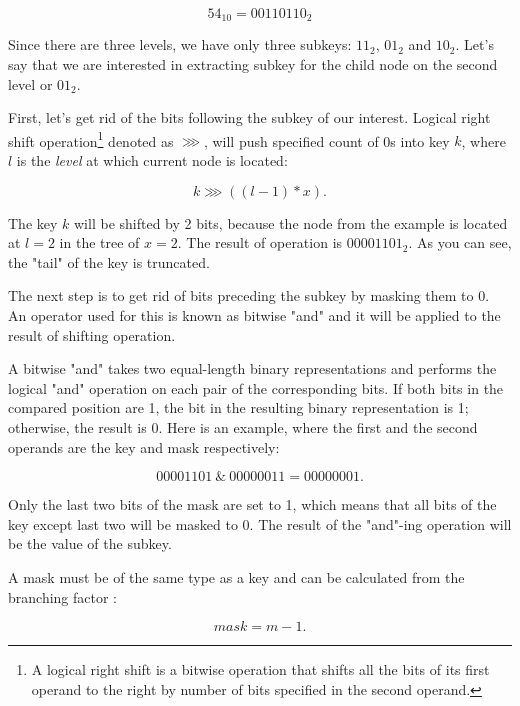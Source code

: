 \begin{equation}
    54_{10} = 00110110_2    
\end{equation}

Since there are three levels, we have only three subkeys: $11_2$, $01_2$ and $10_2$. Let's say that we are interested in extracting subkey for the child node on the second level or $01_2$. 

First, let's get rid of the bits following the subkey of our interest. Logical right shift operation\footnote{A logical right shift is a bitwise operation that shifts all the bits of its first operand to the right by number of bits specified in the second operand.} denoted as $\ggg$, will push specified count of 0s into key $k$, where $l$ is the \emph{level} at which current node is located: 

\begin{equation}
    k \ggg ((l - 1) * x).
\end{equation}

The key $k$ will be shifted by 2 bits, because the node from the example is located at $l = 2$ in the tree of $x = 2$. The result of operation is $00001101_2$. As you can see, the "tail" of the key is truncated.

The next step is to get rid of bits preceding the subkey by masking them to 0. An operator used for this is known as bitwise "and" and it will be applied to the result of shifting operation. 

A bitwise "and" takes two equal-length binary representations and performs the logical "and" operation on each pair of the corresponding bits. If both bits in the compared position are 1, the bit in the resulting binary representation is 1; otherwise, the result is 0. Here is an example, where the first and the second operands are the key and mask respectively: 

\begin{equation}
    00001101 \ \& \ 00000011 = 00000001.
\end{equation}                        

Only the last two bits of the mask are set to 1, which means that all bits of the key except last two will be masked to 0. The result of the "and"-ing operation will be the value of the subkey.

A mask must be of the same type as a key and can be calculated from the branching factor \m:

\begin{equation}
    \mathit{mask} = m - 1.
\end{equation}

